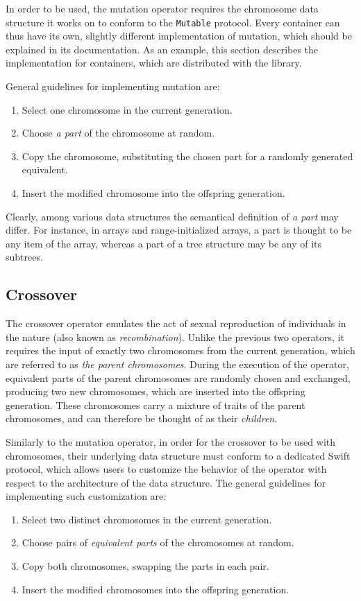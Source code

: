 In order to be used, the mutation operator requires the chromosome data structure it works on to conform to the \texttt{Mutable} protocol. Every container can thus have its own, slightly different implementation of mutation, which should be explained in its documentation. As an example, this section describes the implementation for containers, which are distributed with the library.

General guidelines for implementing mutation are:
~
\begin{enumerate}
	\item Select one chromosome in the current generation.
	\item Choose \textit{a part} of the chromosome at random.
	\item Copy the chromosome, substituting the chosen part for a randomly generated equivalent.
	\item Insert the modified chromosome into the offspring generation.
\end{enumerate}

Clearly, among various data structures the semantical definition of \textit{a part} may differ. For instance, in arrays and range-initialized arrays, a part is thought to be any item of the array, whereas a part of a tree structure may be any of its subtrees.

\subsection{Crossover}\label{section:crossover}
The crossover operator emulates the act of sexual reproduction of individuals in the nature (also known as \textit{recombination}). Unlike the previous two operators, it requires the input of exactly two chromosomes from the current generation, which are referred to as \textit{the parent chromosomes}. During the execution of the operator, equivalent parts of the parent chromosomes are randomly chosen and exchanged, producing two new chromosomes, which are inserted into the offspring generation. These chromosomes carry a mixture of traits of the parent chromosomes, and can therefore be thought of as their \textit{children}.

Similarly to the mutation operator, in order for the crossover to be used with chromosomes, their underlying data structure must conform to a dedicated Swift protocol, which allows users to customize the behavior of the operator with respect to the architecture of the data structure. The general guidelines for implementing such customization are:
~
\begin{enumerate}
	\item Select two distinct chromosomes in the current generation.
	\item Choose pairs of \textit{equivalent parts} of the chromosomes at random.
	\item Copy both chromosomes, swapping the parts in each pair.
	\item Insert the modified chromosomes into the offspring generation.
\end{enumerate}

